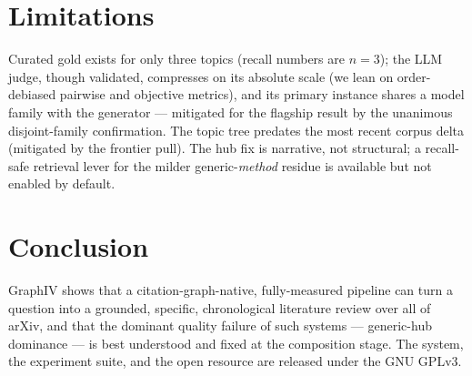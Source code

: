 \documentclass[11pt]{article}
\begin{document}
\section{Limitations}
Curated gold exists for only three topics (recall numbers are $n{=}3$); the LLM judge, though validated,
compresses on its absolute scale (we lean on order-debiased pairwise and objective metrics), and its
primary instance shares a model family with the generator --- mitigated for the flagship result by the
unanimous disjoint-family confirmation. The topic
tree predates the most recent corpus delta (mitigated by the frontier pull). The hub fix is narrative,
not structural; a recall-safe retrieval lever for the milder generic-\emph{method} residue is available
but not enabled by default.

\section{Conclusion}
GraphIV shows that a citation-graph-native, fully-measured pipeline can turn a question into a grounded,
specific, chronological literature review over all of arXiv, and that the dominant quality failure of
such systems --- generic-hub dominance --- is best understood and fixed at the composition stage. The
system, the experiment suite, and the open resource are released under the GNU GPLv3.
\end{document}
